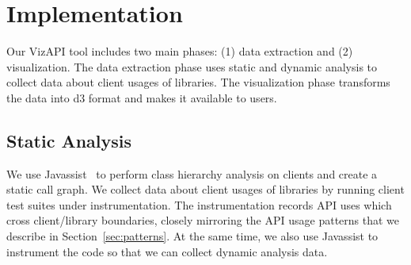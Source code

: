 \section{Implementation}
Our VizAPI tool includes two main phases: (1) data extraction and (2) visualization. The data extraction
phase uses static and dynamic analysis to collect data about client usages of libraries. The visualization
phase transforms the data into d3 format and makes it available to users.

\subsection{Static Analysis}
\label{sec:static}

We use Javassist~\cite{chiba00:_load_struc_reflec_java} to perform
class hierarchy analysis on clients and create a static call graph. We
collect data about client usages of libraries by running client test
suites under instrumentation. The instrumentation records API uses
which cross client/library boundaries, closely mirroring the API usage
patterns that we describe in Section~\ref{sec:patterns}.  At the same
time, we also use Javassist to instrument the code so that we can
collect dynamic analysis data.   \\

